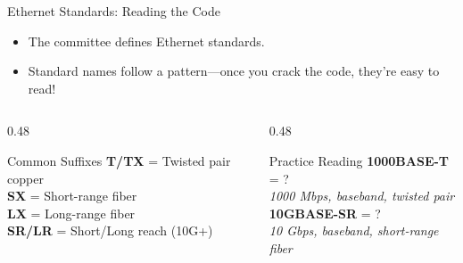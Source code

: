 \documentclass[aspectratio=169]{beamer}  %
\begin{document}
\begin{frame}{Ethernet Standards: Reading the Code}
    \begin{itemize}
        \item The  committee defines Ethernet standards.
        \item Standard names follow a pattern---once you crack the code, they're easy to read!
    \end{itemize}
    
    \begin{center}
    \end{center}
    
    \vspace{0.3em}
    \begin{columns}[T]
        \begin{column}{0.48\textwidth}
            \begin{exampleblock}{Common Suffixes}
                \small
                \textbf{T/TX} = Twisted pair copper \\
                \textbf{SX} = Short-range fiber \\
                \textbf{LX} = Long-range fiber \\
                \textbf{SR/LR} = Short/Long reach (10G+)
            \end{exampleblock}
        \end{column}
        \begin{column}{0.48\textwidth}
            \begin{block}{Practice Reading}
                \small
                \textbf{1000BASE-T} = ? \\
                \textit{1000 Mbps, baseband, twisted pair} \\[0.3em]
                \textbf{10GBASE-SR} = ? \\
                \textit{10 Gbps, baseband, short-range fiber}
            \end{block}
        \end{column}
    \end{columns}
\end{frame}
\end{document}
